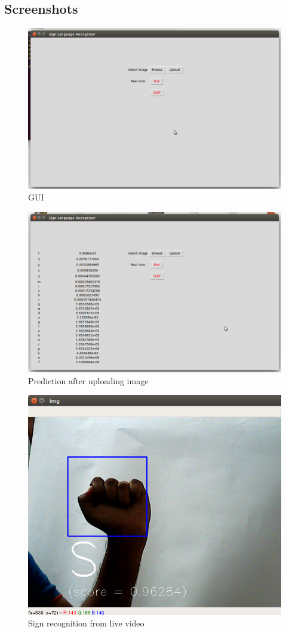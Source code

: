 \subsection{Screenshots}


\begin{figure}[H]
\includegraphics[scale=0.4]{ss1}
\caption{GUI}
\end{figure}

\begin{figure}[H]
\includegraphics[scale=0.4]{ss2}
\caption{Prediction after uploading image}
\end{figure}


\begin{figure}[H]
\includegraphics[scale=0.5]{ss3}
\caption{Sign recognition from live video}
\end{figure}


